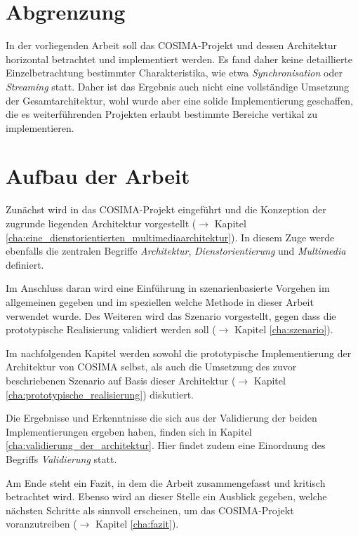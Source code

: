 
\section{Abgrenzung} %
\label{sec:abgrenzung}

  In der vorliegenden Arbeit soll das COSIMA-Projekt und dessen Architektur horizontal betrachtet und implementiert werden. Es fand daher keine detaillierte Einzelbetrachtung bestimmter Charakteristika, wie etwa \emph{Synchronisation} oder \emph{Streaming} statt. Daher ist das Ergebnis auch nicht eine vollständige Umsetzung der Gesamtarchitektur, wohl wurde aber eine solide Implementierung geschaffen, die es weiterführenden Projekten erlaubt bestimmte Bereiche vertikal zu implementieren.


\section{Aufbau der Arbeit} %
\label{sec:aufbau_der_arbeit}

  Zunächst wird in das COSIMA-Projekt eingeführt und die Konzeption der zugrunde liegenden Architektur vorgestellt ($\to$ Kapitel \ref{cha:eine_dienstorientierten_multimediaarchitektur}). In diesem Zuge werde ebenfalls die zentralen Begriffe \emph{Architektur}, \emph{Dienstorientierung} und \emph{Multimedia} definiert.
  
  Im Anschluss daran wird eine Einführung in szenarienbasierte Vorgehen im allgemeinen gegeben und im speziellen welche Methode in dieser Arbeit verwendet wurde. Des Weiteren wird das Szenario vorgestellt, gegen dass die prototypische Realisierung validiert werden soll ($\to$ Kapitel \ref{cha:szenario}).
  
  Im nachfolgenden Kapitel werden sowohl die prototypische Implementierung der Architektur von COSIMA selbst, als auch die Umsetzung des zuvor beschriebenen Szenario auf Basis dieser Architektur ($\to$ Kapitel \ref{cha:prototypische_realisierung}) diskutiert.
  
  Die Ergebnisse und Erkenntnisse die sich aus der Validierung der beiden Implementierungen ergeben haben, finden sich in Kapitel \ref{cha:validierung_der_architektur}. Hier findet zudem eine Einordnung des Begriffs \emph{Validierung} statt.
  
  Am Ende steht ein Fazit, in dem die Arbeit zusammengefasst und kritisch betrachtet wird. Ebenso wird an dieser Stelle ein Ausblick gegeben, welche nächsten Schritte als sinnvoll erscheinen, um das COSIMA-Projekt voranzutreiben ($\to$ Kapitel \ref{cha:fazit}).
  

